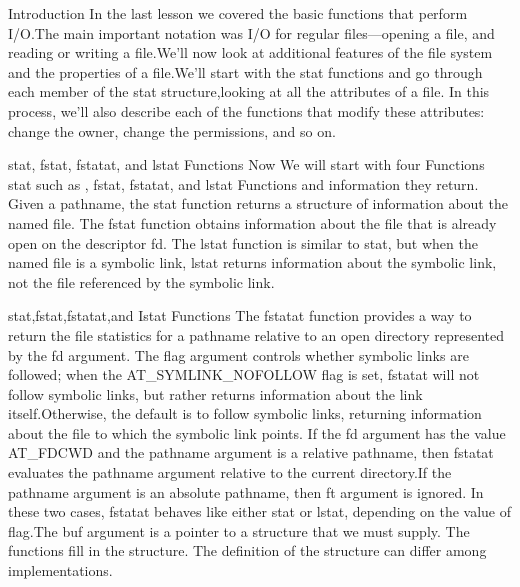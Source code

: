 \documentclass{beamer}
\begin{document}
\begin{frame}[t]{Introduction}\vspace*{4pt}
In the last lesson  we covered the basic functions that perform I/O.The main important notation was I/O for regular files—opening a file, and reading or writing a file.We’ll now look at additional features of the file system and the properties of a file.We’ll start with the stat functions and go through each member of the stat structure,looking at all the attributes of a file. In this process, we’ll also describe each of the functions that modify these attributes: change the owner, change the permissions, and
so on.

\end{frame}
 \begin{frame}[t]{stat, fstat, fstatat, and lstat Functions }\vspace*{4 pt}
 Now We will start with four Functions stat such as , fstat, fstatat, and lstat Functions and information  they return.
 Given a pathname, the stat function returns a structure of information about the named file. The fstat function obtains information about the file that is already open on the descriptor fd. The lstat function is similar to stat, but when the named file is a symbolic link, lstat returns information about the symbolic link, not the file referenced by the symbolic link.


\end{frame}
   \begin{frame}[t]{stat,fstat,fstatat,and Istat Functions}\vspace*{4pt}
    The fstatat function provides a way to return the file statistics for a pathname relative to an open directory represented by the fd argument. The flag argument controls whether symbolic links are followed; when the AT\_SYMLINK\_NOFOLLOW flag is set, fstatat will not follow symbolic links, but rather returns information about the link itself.Otherwise, the default is to follow symbolic links, returning information about the file to which the symbolic link points. If the fd argument has the value
    AT\_FDCWD and the pathname argument is a relative pathname, then fstatat evaluates the pathname argument relative to the current directory.If the pathname argument is an absolute pathname, then ft  argument is ignored. In these two cases, fstatat behaves like either stat or lstat, depending on the value of flag.The buf argument is a pointer to a structure that we must supply. The functions fill in the structure. The definition of the structure can differ among implementations.    
\end{frame}
\end{document}
